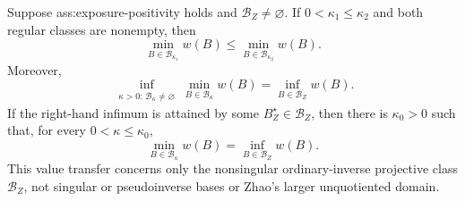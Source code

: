 Suppose ass:exposure-positivity holds and \(\mathcal B_Z\ne\varnothing\).  If \(0<\kappa_1\le\kappa_2\) and both regular classes are nonempty, then
\[
\min_{B\in\mathcal B_{\kappa_1}}w(B)
\le
\min_{B\in\mathcal B_{\kappa_2}}w(B).
\]
Moreover,
\[
\inf_{\substack{\kappa>0:\,\mathcal B_\kappa\ne\varnothing}}
\min_{B\in\mathcal B_\kappa}w(B)
=
\inf_{B\in\mathcal B_Z}w(B).
\]
If the right-hand infimum is attained by some \(B_Z^\star\in\mathcal B_Z\), then there is \(\kappa_0>0\) such that, for every \(0<\kappa\le\kappa_0\),
\[
\min_{B\in\mathcal B_\kappa}w(B)=\inf_{B\in\mathcal B_Z}w(B).
\]
This value transfer concerns only the nonsingular ordinary-inverse projective class \(\mathcal B_Z\), not singular or pseudoinverse bases or Zhao's larger unquotiented domain.